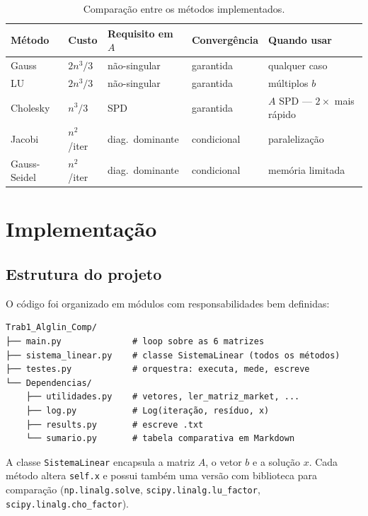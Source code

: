 \documentclass[12pt, a4paper]{article}
\begin{document}
\begin{table}[H]
  \centering
  \caption{Comparação entre os métodos implementados.}
  \label{tab:metodos}
  \renewcommand{\arraystretch}{1.3}
  \begin{tabular}{lllll}
    \toprule
    \textbf{Método} & \textbf{Custo} & \textbf{Requisito em $A$}
      & \textbf{Convergência} & \textbf{Quando usar} \\
    \midrule
    Gauss      & $2n^3/3$       & não-singular     & garantida    & qualquer caso \\
    LU         & $2n^3/3$       & não-singular     & garantida    & múltiplos $b$ \\
    Cholesky   & $n^3/3$        & SPD              & garantida    & $A$ SPD — $2\times$ mais rápido \\
    Jacobi     & $n^2$/iter     & diag.\ dominante & condicional  & paralelização \\
    Gauss-Seidel & $n^2$/iter   & diag.\ dominante & condicional  & memória limitada \\
    \bottomrule
  \end{tabular}
\end{table}
 
\section{Implementação}
 
\subsection{Estrutura do projeto}
 
O código foi organizado em módulos com responsabilidades bem definidas:
 
\begin{verbatim}
Trab1_Alglin_Comp/
├── main.py              # loop sobre as 6 matrizes
├── sistema_linear.py    # classe SistemaLinear (todos os métodos)
├── testes.py            # orquestra: executa, mede, escreve
└── Dependencias/
    ├── utilidades.py    # vetores, ler_matriz_market, ...
    ├── log.py           # Log(iteração, resíduo, x)
    ├── results.py       # escreve .txt
    └── sumario.py       # tabela comparativa em Markdown
\end{verbatim}
 
A classe \texttt{SistemaLinear} encapsula a matriz $A$, o vetor $b$ e a solução $x$.
Cada método altera \texttt{self.x} e possui também uma versão com biblioteca para
comparação (\texttt{np.linalg.solve}, \texttt{scipy.linalg.lu\_factor},
\texttt{scipy.linalg.cho\_factor}).
 
\end{document}
